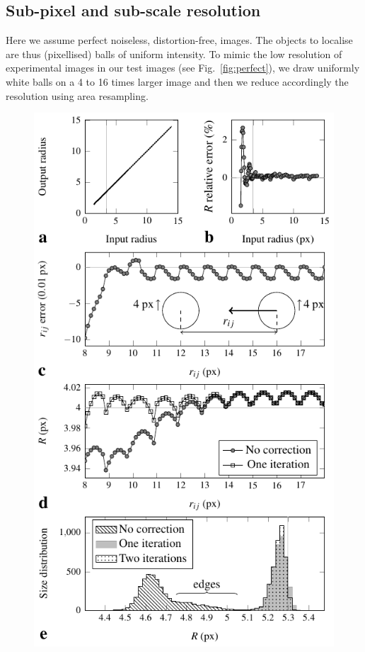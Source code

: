 \documentclass[8.5pt,twoside,twocolumn]{article}
\begin{document}
\subsection{Sub-pixel and sub-scale resolution}

Here we assume perfect noiseless, distortion-free, images. The objects to localise are thus (pixellised) balls of uniform intensity. To mimic the low resolution of experimental images in our test images (see Fig.~\ref{fig:perfect}), we draw uniformly white balls on a 4 to 16 times larger image and then we reduce accordingly the resolution using area resampling.

\begin{figure}
\centering
\includegraphics{fig_perfect.pdf}

\end{figure}
\end{document}
